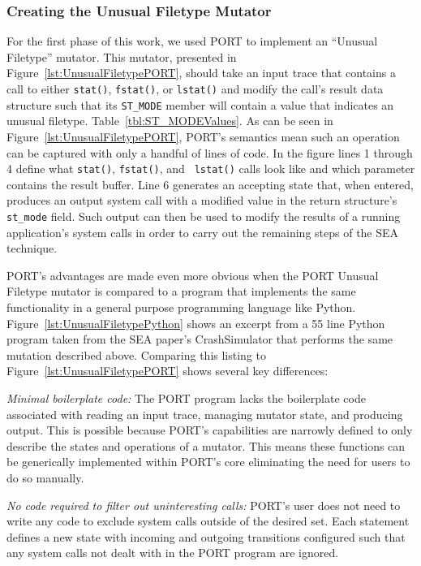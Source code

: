 \subsubsection{Creating the Unusual Filetype Mutator}
\label{subsub:UnusualFiletype}
For the first phase of this work,
we used PORT to implement an ``Unusual Filetype''
mutator.
This mutator, presented in
Figure~\ref{lst:UnusualFiletypePORT},
should take an input trace
that contains a call to either {\tt stat()},
{\tt fstat()},
or {\tt lstat()}
and modify the call's result data structure such
that its {\tt ST\_MODE} member will contain a value
that indicates an unusual filetype.
Table~\ref{tbl:ST_MODEValues}.  As can be seen in
Figure~\ref{lst:UnusualFiletypePORT}, PORT's semantics mean such an
operation can be captured with only a handful of lines of code.  In the
figure
lines 1 through 4 define what {\tt stat()}, {\tt fstat()}, and {\tt
lstat()} calls look like and which parameter contains the result buffer.
Line 6 generates an accepting state that, when entered, produces an output
system call with a modified value in the return structure's {\tt st\_mode}
field.  Such output can then be used to modify the results of a running
application's system calls in order to carry out the remaining steps of the
SEA technique.

PORT's advantages are made even more obvious when the PORT Unusual
Filetype mutator is compared to a program that implements the same
functionality in a general purpose programming language like Python.
Figure~\ref{lst:UnusualFiletypePython} shows an excerpt from a 55 line
Python program taken from the SEA paper's CrashSimulator that performs the
same mutation described above.  Comparing this listing to
Figure~\ref{lst:UnusualFiletypePORT} shows several key differences:

\textit{Minimal boilerplate code:} The PORT program lacks the boilerplate
code associated with
reading an input trace, managing mutator state, and producing output.
This is possible because PORT's capabilities are narrowly defined to
only describe the states and operations of a mutator.  This means these
functions can be generically implemented within PORT's core eliminating
the need for users to do so manually.

\textit{No code required to filter out uninteresting calls:}
PORT's user does
not need to write any code to exclude system
calls outside of the desired set.  Each statement defines a new state with
incoming and outgoing transitions configured such that any system calls not
dealt with in the PORT program are ignored.

